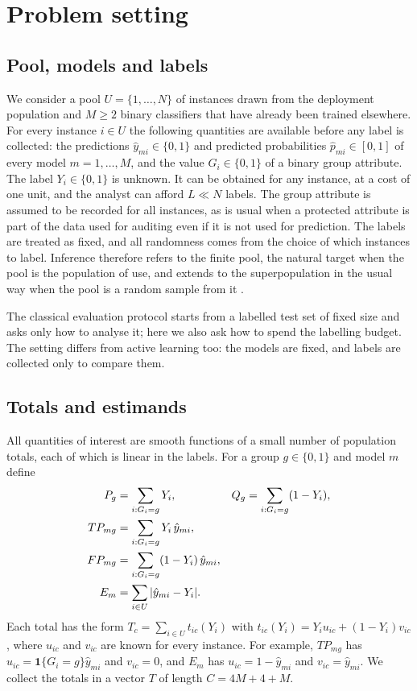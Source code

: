 \section{Problem setting}\label{sec:setting}

\subsection{Pool, models and labels}
We consider a pool $U=\{1,\dots,N\}$ of instances drawn from the deployment population and $M\ge 2$ binary classifiers that have already been trained elsewhere. For every instance $i\in U$ the following quantities are available before any label is collected: the predictions $\hat y_{mi}\in\{0,1\}$ and predicted probabilities $\hat p_{mi}\in[0,1]$ of every model $m=1,\dots,M$, and the value $G_i\in\{0,1\}$ of a binary group attribute. The label $Y_i\in\{0,1\}$ is unknown. It can be obtained for any instance, at a cost of one unit, and the analyst can afford $L\ll N$ labels. The group attribute is assumed to be recorded for all instances, as is usual when a protected attribute is part of the data used for auditing even if it is not used for prediction. The labels are treated as fixed, and all randomness comes from the choice of which instances to label. Inference therefore refers to the finite pool, the natural target when the pool is the population of use, and extends to the superpopulation in the usual way when the pool is a random sample from it \citep{sarndal1992}.

The classical evaluation protocol starts from a labelled test set of fixed size and asks only how to analyse it; here we also ask how to spend the labelling budget. The setting differs from active learning too: the models are fixed, and labels are collected only to compare them.

\subsection{Totals and estimands}
All quantities of interest are smooth functions of a small number of population totals, each of which is linear in the labels. For a group $g\in\{0,1\}$ and model $m$ define
\begin{align}
P_g &= \sum_{i:G_i=g} Y_i, & Q_g &= \sum_{i:G_i=g} (1-Y_i),\label{eq:PQ}\\
TP_{mg} &= \sum_{i:G_i=g} Y_i\,\hat y_{mi},\notag\\
FP_{mg} &= \sum_{i:G_i=g} (1-Y_i)\,\hat y_{mi},\notag\\
E_m &= \sum_{i\in U}|\hat y_{mi}-Y_i|.\label{eq:TPFP}
\end{align}
Each total has the form $T_c=\sum_{i\in U} t_{ic}(Y_i)$ with $t_{ic}(Y_i)=Y_i u_{ic}+(1-Y_i)v_{ic}$, where $u_{ic}$ and $v_{ic}$ are known for every instance. For example, $TP_{mg}$ has $u_{ic}=\mathbf 1\{G_i=g\}\hat y_{mi}$ and $v_{ic}=0$, and $E_m$ has $u_{ic}=1-\hat y_{mi}$ and $v_{ic}=\hat y_{mi}$. We collect the totals in a vector $T$ of length $C=4M+4+M$.

